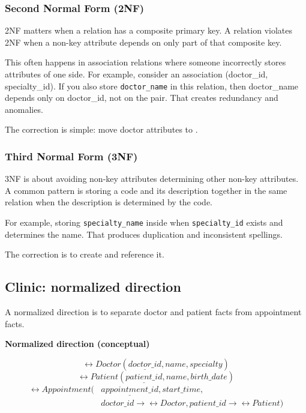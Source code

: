 \subsubsection{Second Normal Form (2NF)}
2NF matters when a relation has a composite primary key.
A relation violates 2NF when a non-key attribute depends on only part of that composite key.

This often happens in association relations where someone incorrectly stores attributes of one side.
For example, consider an association (doctor\_id, specialty\_id).
If you also store \texttt{doctor\_name} in this relation, then doctor\_name depends only on doctor\_id, not on the pair.
That creates redundancy and anomalies.

The correction is simple: move doctor attributes to .

\subsubsection{Third Normal Form (3NF)}
3NF is about avoiding non-key attributes determining other non-key attributes.
A common pattern is storing a code and its description together in the same relation when the description is determined by the code.

For example, storing \texttt{specialty\_name} inside  when \texttt{specialty\_id} exists and determines the name.
That produces duplication and inconsistent spellings.

The correction is to create  and reference it.

\subsection{Clinic: normalized direction}
A normalized direction is to separate doctor and patient facts from appointment facts.

\begin{examplebox}
\textbf{Normalized direction (conceptual)}\par\smallskip
\[
\rel{Doctor}(\underline{doctor\_id}, name, specialty)
\]
\[
\rel{Patient}(\underline{patient\_id}, name, birth\_date)
\]
\[
\begin{aligned}
\rel{Appointment}(&\underline{appointment\_id}, start\_time, \\
&doctor\_id \rightarrow \rel{Doctor}, patient\_id \rightarrow \rel{Patient})
\end{aligned}
\]
\end{examplebox}

